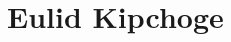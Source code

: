 \documentclass[letterpaper]{article}
\newcommand{\titleDOC}{}
\newcommand{\authorDOC}{Daniel Sabalakov}
\newcommand{\classDOC}{}
\begin{document}








\renewcommand{\authorDOC}{Daniel Sabalakov}

\renewcommand{\titleDOC}{3.2; Runner Bio}

\renewcommand{\classDOC}{VLACS Running}



\newpage

\section{Eulid Kipchoge}\label{eulid-kipchoge}

\newpage
\end{document}
